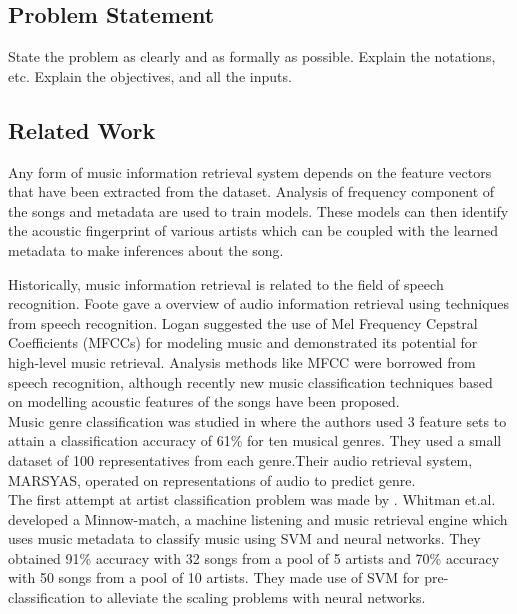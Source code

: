 \documentclass[twocolumn]{article}
\newcommand{\comment}[1]{}
\begin{document}
\subsection{Problem Statement}

State the problem as clearly and as formally as possible.
Explain the notations, etc.
Explain the objectives, and all the inputs.

\subsection{Related Work}

Any form of music information retrieval system depends on the feature vectors that have been extracted from the dataset. Analysis of frequency component of the songs and metadata are used to train models. These models can then identify the acoustic fingerprint of various artists which can be coupled with the learned metadata to make inferences about the song.  

Historically, music information retrieval is related to the field of speech recognition. Foote \cite{Foote} gave a overview of audio information retrieval using techniques from speech recognition. Logan \cite{LOGAN} suggested the use of Mel Frequency Cepstral Coefficients (MFCCs) for modeling music and demonstrated its potential for high-level music retrieval. Analysis methods like MFCC were borrowed from speech recognition, although recently new music classification techniques based on modelling acoustic features of the songs have been proposed.\\
Music genre classification was studied in \cite{GTAN} where the authors used 3 feature sets to attain a classification accuracy of 61\% for ten musical genres. They used a small dataset of 100 representatives from each genre.Their audio retrieval system, MARSYAS, operated on representations of audio to predict genre.\\
The first attempt at artist classification problem was made by \cite{BGS}. Whitman et.al.\cite{BGS} developed a Minnow-match, a machine listening and music retrieval engine which uses music metadata to classify music using SVM and neural networks. They obtained 91\% accuracy with 32 songs from a pool of 5 artists and 70\% accuracy with 50 songs from a pool of 10 artists. They made use of SVM for pre-classification to alleviate the scaling problems with neural networks.
\comment{

Can also comment out paragraphs, etc.

}
\end{document}
